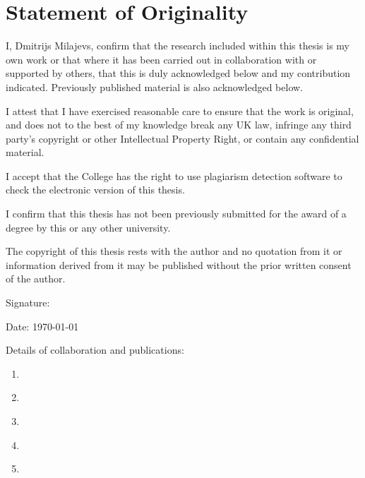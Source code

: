 \chapter*{Statement of Originality}

I, Dmitrijs Milajevs, confirm that the research included within this thesis is my own work or that where it has been carried out in collaboration with or supported by others, that this is duly acknowledged below and my contribution indicated. Previously published material is also acknowledged below.

I attest that I have exercised reasonable care to ensure that the work is original, and does not to the best of my knowledge break any UK law, infringe any third party’s copyright or other Intellectual Property Right, or contain any confidential material.

I accept that the College has the right to use plagiarism detection software to check the electronic version of this thesis.

I confirm that this thesis has not been previously submitted for the award of a degree by this or any other university.

The copyright of this thesis rests with the author and no quotation from it or information derived from it may be published without the prior written consent of the author.

Signature:

Date: \today

Details of collaboration and publications:
\begin{enumerate}
\item \citet*{milajevs-purver:2014:CVSC}
\item \citet*{milajevs-EtAl:2014:EMNLP2014}
\item \citet*{Milajevs:2015:IMN:2808194.2809448}
\item \citet*{milajevs-sadrzadeh-purver:2016:ACL-SRW}
\item \citet*{milajevs-griffiths:2016:repeval}
\end{enumerate}

